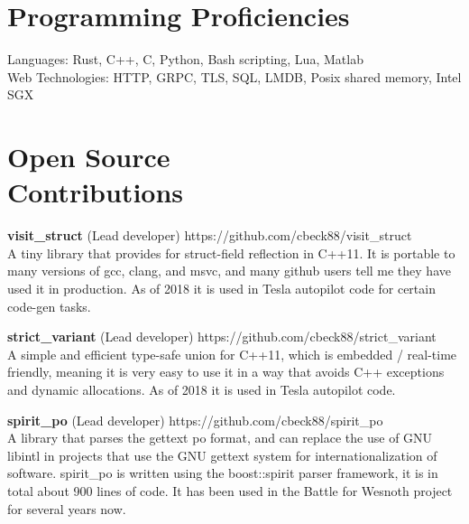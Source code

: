 \documentclass[margin,line]{resume}
\begin{document}
\begin{resume}

       


    \section{\mysidestyle Programming Proficiencies} 

    Languages: Rust, C++, C, Python, Bash scripting, Lua, Matlab \\
    Web Technologies: HTTP, GRPC, TLS, SQL, LMDB, Posix shared memory, Intel SGX

    \section{\mysidestyle Open Source\\Contributions}

    \textbf{visit\_struct} (Lead developer) \hfill https://github.com/cbeck88/visit\_struct \\
    A tiny library that provides for struct-field reflection in C++11. It is portable to many versions of gcc, clang, and msvc,
    and many github users tell me they have used it in production. As of 2018 it is used in Tesla autopilot code for certain code-gen tasks.

    \textbf{strict\_variant} (Lead developer) \hfill https://github.com/cbeck88/strict\_variant \\
    A simple and efficient type-safe union for C++11, which is embedded / real-time friendly, meaning it is very easy
    to use it in a way that avoids C++ exceptions and dynamic allocations. As of 2018 it is used in Tesla autopilot code.

    \textbf{spirit\_po} (Lead developer) \hfill https://github.com/cbeck88/spirit\_po \\
    A library that parses the gettext po format, and can replace the use of GNU libintl in projects that use the GNU
    gettext system for internationalization of software.
    spirit\_po is written using the boost::spirit parser framework, it is in total about 900 lines of code.
    It has been used in the Battle for Wesnoth project for several years now.


\end{resume}
\end{document}
